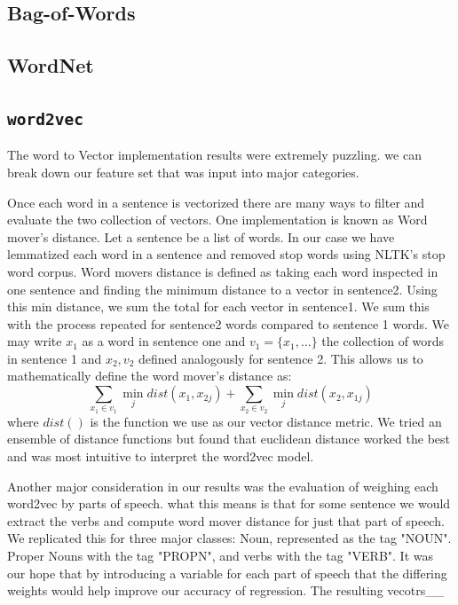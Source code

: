 \documentclass{article} %
\newcommand{\wordtvec}{\texttt{word2vec}}
\begin{document}
\subsection{Bag-of-Words} \label{sub:bow_res}

\subsection{WordNet} \label{sub:wnet_res}

\subsection{\wordtvec}
The word to Vector implementation results were extremely puzzling. we can break down our feature set that was input into major categories.

Once each word in a sentence is vectorized there are many ways to filter and evaluate the two collection of vectors. One implementation is known as Word mover's distance. Let a sentence be a list of words. In our case we have lemmatized each word in a sentence and removed stop words using NLTK's stop word corpus. Word movers distance is defined as taking each word inspected in one sentence and finding the minimum distance to a vector in sentence2. Using this min distance, we sum the total for each vector in sentence1. We sum this with the process repeated for sentence2 words compared to sentence 1 words. We may write $x_1$ as a word in sentence one and $v_1 = \{x_1,...\}$ the collection of words in sentence 1 and $x_2, v_2$ defined analogously for sentence 2. This allows us to mathematically define the word mover's distance as:
$$ \sum_{x_1 \in v_1} \min_j{dist(x_1,x_{2j}) } + \sum_{x_2 \in v_2} \min_j{dist(x_2,x_{1j}) } $$
where $dist()$ is the function we use as our vector distance metric. We tried an ensemble of distance functions but found that euclidean distance worked the best and was most intuitive to interpret the word2vec model. 

Another major consideration in our results was the evaluation of weighing each word2vec by parts of speech. what this means is that for some sentence we would extract the verbs and compute word mover distance for just that part of speech. We replicated this for three major classes: Noun, represented as the tag "NOUN". Proper Nouns with the tag "PROPN", and verbs with the tag "VERB". 
It was our hope that by introducing a variable for each part of speech that the differing weights would help improve our accuracy of regression. The resulting vecotrs\_\_
\end{document}

